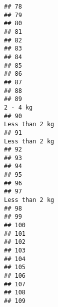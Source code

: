 \documentclass[
]{article}
\begin{document}
\begin{verbatim}
## 78                                                                             
## 79                                                                             
## 80                                                                             
## 81                                                                             
## 82                                                                             
## 83                                                                             
## 84                                                                             
## 85                                                                             
## 86                                                                             
## 87                                                                             
## 88                                                                             
## 89                                                                     2 - 4 kg
## 90                                                               Less than 2 kg
## 91                                                               Less than 2 kg
## 92                                                                             
## 93                                                                             
## 94                                                                             
## 95                                                                             
## 96                                                                             
## 97                                                               Less than 2 kg
## 98                                                                             
## 99                                                                             
## 100                                                                            
## 101                                                                            
## 102                                                                            
## 103                                                                            
## 104                                                                            
## 105                                                                            
## 106                                                                            
## 107                                                                            
## 108                                                                            
## 109                                                                            

\end{verbatim}
\end{document}
